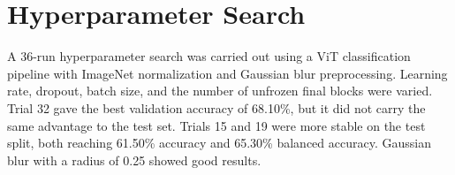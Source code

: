 ﻿\documentclass[12pt,a4paper]{report}
\begin{document}
\begin{table}[H]
\centering
\scriptsize
{}
\caption{Equalized dataset multiclass confusion matrix}
\label{tab:equalized_cm}
\end{table}

\begin{table}[H]
\centering
\scriptsize
{}
\caption{ResNet18 direct four-class confusion matrix}
\label{tab:resnet_direct_cm}
\end{table}

\section{Hyperparameter Search}
A 36-run hyperparameter search was carried out using a ViT classification pipeline with ImageNet normalization and Gaussian blur preprocessing. Learning rate, dropout, batch size, and the number of unfrozen final blocks were varied. Trial 32 gave the best validation accuracy of 68.10\%, but it did not carry the same advantage to the test set. Trials 15 and 19 were more stable on the test split, both reaching 61.50\% accuracy and 65.30\% balanced accuracy. Gaussian blur with a radius of 0.25 showed good results.
\end{document}
